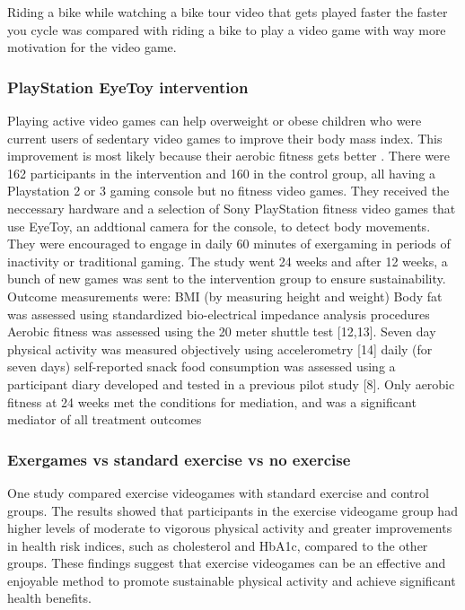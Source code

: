 Riding a bike while watching a bike tour video that gets played faster the faster you cycle was compared with riding a bike to play a video game with way more motivation for the video game. \cite{hardy2011adoption}

\subsubsection{PlayStation EyeToy intervention}
Playing active video games can help overweight or obese children who were current users of sedentary video games to improve their body mass index. This improvement is most likely because their aerobic fitness gets better \cite{maddison12avg}. There were 162 participants in the intervention and 160 in the control group, all having a Playstation 2 or 3 gaming console but no fitness video games. They received the neccessary hardware and a selection of Sony PlayStation fitness video games that use EyeToy, an addtional camera for the console, to detect body movements. They were encouraged to engage in daily 60 minutes of exergaming in periods of inactivity or traditional gaming. The study went 24 weeks and after 12 weeks, a bunch of new games was sent to the intervention group to ensure sustainability.
Outcome measurements were:
BMI (by measuring height and weight)
Body fat was assessed using standardized bio-electrical impedance analysis procedures
Aerobic fitness was assessed using the 20 meter shuttle test [12,13].
Seven day physical activity was measured objectively using accelerometry [14]
daily (for seven days) self-reported snack food consumption was assessed using a participant diary developed and tested in a previous pilot study [8].
Only aerobic fitness at 24 weeks met the conditions for mediation, and was a significant mediator of all treatment outcomes

\subsubsection{Exergames vs standard exercise vs no exercise}
One study \cite{bock2019exercise} compared exercise videogames with standard exercise and control groups. The results showed that participants in the exercise videogame group had higher levels of moderate to vigorous physical activity and greater improvements in health risk indices, such as cholesterol and HbA1c, compared to the other groups. These findings suggest that exercise videogames can be an effective and enjoyable method to promote sustainable physical activity and achieve significant health benefits.

